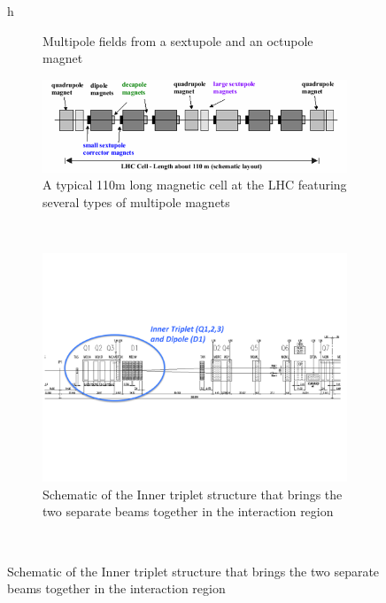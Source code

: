 \begin{figure}{h}
\begin{subfigure}[h]{0.450\textwidth}
        \caption{Multipole fields from a sextupole and an octupole
          magnet \cite{LHC:LHC_lhc_multipole_focusing_schematic_image}}\label{fig:lhc_multipole_field}
      \end{subfigure}
      \begin{subfigure}[h]{0.450\textwidth}
        \includegraphics[width=\textwidth]{Figures/LHC_Diagrams/LHC_MagneticCell.png}
        \caption{A typical 110m long magnetic cell at the LHC featuring
        several types of multipole magnets \cite{LHC:LHC_lhc_magnetic_cell_schematic_image}}\label{fig:lhc_magnetic_cell}
      \end{subfigure}
      ~ %
      \begin{subfigure}[h]{0.450\textwidth}
        \includegraphics[width=\textwidth]{Figures/LHC_Diagrams/LHC_InnerTriplet.pdf}
        \caption{Schematic of the Inner triplet structure that brings
          the two separate beams together in the interaction region \cite{lhc:machine_description}}\label{fig:lhc_inner_triplet}
      \end{subfigure}
      ~ %

\end{figure}

